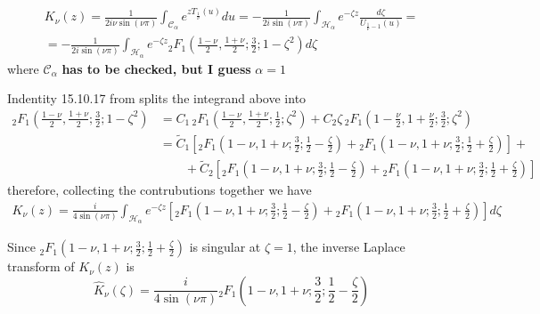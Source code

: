\documentclass{article}
\begin{document}
\begin{multline}
K_{\nu}(z)=\frac{1}{2i\nu\sin(\nu\pi)}\int_{\mathcal{C}_{\alpha}}e^{zT_{\frac{1}{\nu}}(u)}du=-\frac{1}{2i\sin(\nu\pi)}\int_{\mathcal{H}_{\alpha}}e^{-\zeta z}\frac{d\zeta}{U_{\frac{1}{\nu}-1}(u)}=\\
=-\frac{1}{2i\sin(\nu\pi)}\int_{\mathcal{H}_{\alpha}}e^{-\zeta z}{}_2F_1\left(\frac{1-\nu}{2},\frac{1+\nu}{2};\frac{3}{2};1-\zeta^2\right)d\zeta
\end{multline}
where $\mathcal{C}_{\alpha}$ \textbf{has to be checked, but I guess } $\alpha=1$

Indentity 15.10.17 from \cite{dlmf} splits the integrand above into
\begin{align*}
{}_2F_1\left(\frac{1-\nu}{2},\frac{1+\nu}{2};\frac{3}{2};1-\zeta^2\right)&=C_1 \, {}_2F_1\left(\frac{1-\nu}{2},\frac{1+\nu}{2};\frac{1}{2};\zeta^2\right)+C_2\zeta \,{}_2F_1\left(1-\frac{\nu}{2},1+\frac{\nu}{2};\frac{3}{2};\zeta^2\right)\\
&=\tilde{C}_1\left[{}_2F_1\left({1-\nu},{1+\nu};\frac{3}{2};\frac{1}{2}-\frac{\zeta}{2}\right)+{}_2F_1\left({1-\nu},{1+\nu};\frac{3}{2};\frac{1}{2}+\frac{\zeta}{2}\right)\right]+\\
&\qquad+\tilde{C}_2\left[{}_2F_1\left({1-\nu},{1+\nu};\frac{3}{2};\frac{1}{2}-\frac{\zeta}{2}\right)+{}_2F_1\left({1-\nu},{1+\nu};\frac{3}{2};\frac{1}{2}+\frac{\zeta}{2}\right)\right]
\end{align*}
therefore, collecting the contrubutions together we have 
\begin{multline}
K_{\nu}(z)=\frac{i}{4\sin(\nu\pi)}\int_{\mathcal{H}_{\alpha}}e^{-\zeta z}\left[{}_2F_1\left({1-\nu},{1+\nu};\frac{3}{2};\frac{1}{2}-\frac{\zeta}{2}\right)+{}_2F_1\left({1-\nu},{1+\nu};\frac{3}{2};\frac{1}{2}+\frac{\zeta}{2}\right)\right] d\zeta
\end{multline}

Since ${}_2F_1\left({1-\nu},{1+\nu};\frac{3}{2};\frac{1}{2}+\frac{\zeta}{2}\right) $ is singular at $\zeta=1$, the inverse Laplace transform of $K_\nu(z)$ is 
\[
\hat{K}_{\nu}(\zeta)=\frac{i}{4\sin(\nu\pi)}{}_2F_1\left({1-\nu},{1+\nu};\frac{3}{2};\frac{1}{2}-\frac{\zeta}{2}\right)
\] 


\end{document}
